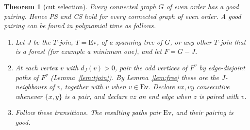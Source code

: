 \documentclass[11pt]{amsart}
\newtheorem{theorem}{Theorem}
\theoremstyle{definition}
\newcommand{\Ev}{\mathrm{Ev}}
\begin{document}
\begin{theorem}[cut selection]\label{thm:ps}
Every connected graph $G$ of even order has a good pairing. Hence PS and CS hold for every connected
graph of even order. A good pairing can be found in polynomial time as follows.
\begin{enumerate}
\item Let $J$ be the $T$-join, $T=\Ev$, of a spanning tree of $G$, or any other $T$-join that is a
forest (for example a minimum one), and let $F=G-J$.
\item At each vertex $v$ with $d_J(v)>0$, pair the odd vertices of $F^v$ by edge-disjoint paths of
$F^v$ (Lemma~\ref{lem:tjoin}). By Lemma~\ref{lem:free} these are the $J$-neighbours of $v$, together
with $v$ when $v\in\Ev$. Declare $vx,vy$ consecutive whenever $\{x,y\}$ is a pair, and declare $vz$
an end edge when $z$ is paired with $v$.
\item Follow these transitions. The resulting paths pair $\Ev$, and their pairing is good.
\end{enumerate}
\end{theorem}
\end{document}
